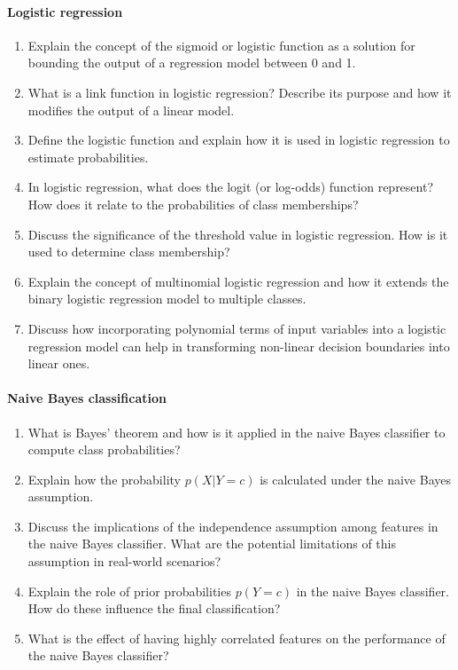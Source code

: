 \paragraph*{Logistic regression}
\begin{enumerate}
  \item Explain the concept of the sigmoid or logistic function as a solution for bounding the output of a regression model between 0 and 1.
  \item What is a link function in logistic regression? Describe its purpose and how it modifies the output of a linear model.
  \item Define the logistic function and explain how it is used in logistic regression to estimate probabilities.
  \item In logistic regression, what does the logit (or log-odds) function represent? How does it relate to the probabilities of class memberships?
  \item Discuss the significance of the threshold value in logistic regression. How is it used to determine class membership?
  \item Explain the concept of multinomial logistic regression and how it extends the binary logistic regression model to multiple classes.
  \item Discuss how incorporating polynomial terms of input variables into a logistic regression model can help in transforming non-linear decision boundaries into linear ones.
\end{enumerate}
\paragraph*{Naive Bayes classification}
\begin{enumerate}
  \item What is Bayes' theorem and how is it applied in the naive Bayes classifier to compute class probabilities?
  \item Explain how the probability $p(X|Y=c)$ is calculated under the naive Bayes assumption.
  \item Discuss the implications of the independence assumption among features in the naive Bayes classifier. What are the potential limitations of this assumption in real-world scenarios?
  \item Explain the role of prior probabilities $p(Y=c)$ in the naive Bayes classifier. How do these influence the final classification?
  \item What is the effect of having highly correlated features on the performance of the naive Bayes classifier?
\end{enumerate}
